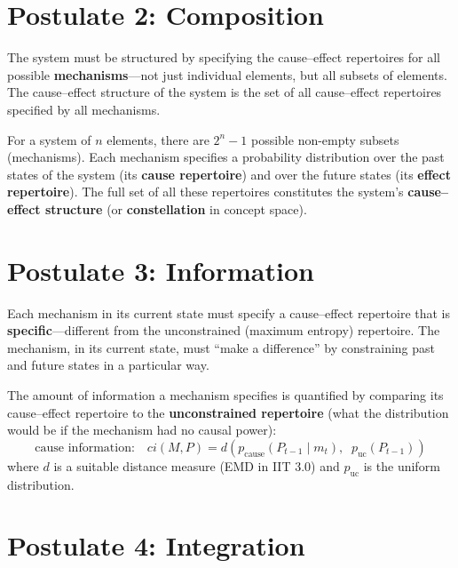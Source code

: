 \documentclass[11pt,a4paper]{report}
\begin{document}
\section{Postulate 2: Composition}

\begin{postulatebox}
The system must be structured by specifying the cause--effect repertoires for all possible \textbf{mechanisms}---not just individual elements, but all subsets of elements. The cause--effect structure of the system is the set of all cause--effect repertoires specified by all mechanisms.
\end{postulatebox}

For a system of $n$ elements, there are $2^n - 1$ possible non-empty subsets (mechanisms). Each mechanism specifies a probability distribution over the past states of the system (its \textbf{cause repertoire}) and over the future states (its \textbf{effect repertoire}). The full set of all these repertoires constitutes the system's \textbf{cause--effect structure} (or \textbf{constellation} in concept space).

\section{Postulate 3: Information}

\begin{postulatebox}
Each mechanism in its current state must specify a cause--effect repertoire that is \textbf{specific}---different from the unconstrained (maximum entropy) repertoire. The mechanism, in its current state, must ``make a difference'' by constraining past and future states in a particular way.
\end{postulatebox}

The amount of information a mechanism specifies is quantified by comparing its cause--effect repertoire to the \textbf{unconstrained repertoire} (what the distribution would be if the mechanism had no causal power):
\[
  \text{cause information:}\quad ci(M, P) = d\!\left(p_{\text{cause}}(P_{t-1} \mid m_t),\;\; p_{\text{uc}}(P_{t-1})\right)
\]
where $d$ is a suitable distance measure (EMD in IIT 3.0) and $p_{\text{uc}}$ is the uniform distribution.

\section{Postulate 4: Integration}
\end{document}
